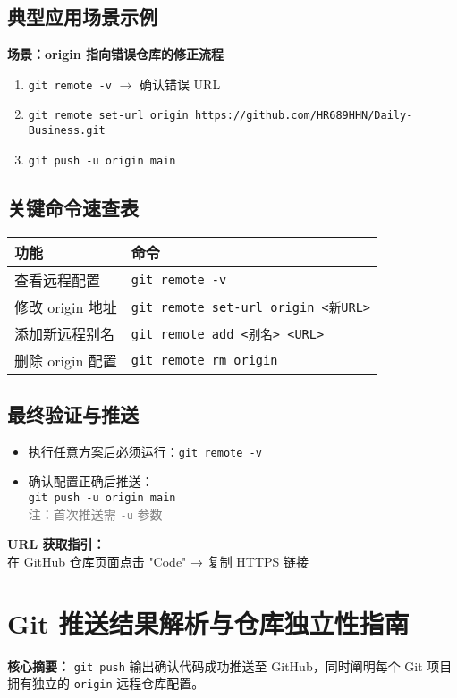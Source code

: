 \subsection{典型应用场景示例}
\textbf{场景：origin 指向错误仓库的修正流程} \\
\begin{enumerate}[leftmargin=*, nosep]
    \item \texttt{git remote -v} $\rightarrow$ 确认错误 URL
    \item \texttt{git remote set-url origin https://github.com/HR689HHN/Daily-Business.git}
    \item \texttt{git push -u origin main}
\end{enumerate}

\subsection{关键命令速查表}
\begin{center}
\begin{tabular}{ll}
    \toprule
    \textbf{功能} & \textbf{命令} \\
    \midrule
    查看远程配置 & \texttt{git remote -v} \\
    修改 origin 地址 & \texttt{git remote set-url origin <新URL>} \\
    添加新远程别名 & \texttt{git remote add <别名> <URL>} \\
    删除 origin 配置 & \texttt{git remote rm origin} \\
    \bottomrule
\end{tabular}
\end{center}

\subsection{最终验证与推送}
\begin{itemize}[leftmargin=*, nosep]
    \item 执行任意方案后必须运行：\texttt{git remote -v}
    \item 确认配置正确后推送：\\
    \texttt{git push -u origin main} \\
    \textcolor{gray}{注：首次推送需 \texttt{-u} 参数}
\end{itemize}

\textbf{URL 获取指引：} \\
在 GitHub 仓库页面点击 "Code" → 复制 HTTPS 链接


\section{Git 推送结果解析与仓库独立性指南}
\textbf{核心摘要：}  
\texttt{git push} 输出确认代码成功推送至 GitHub，同时阐明每个 Git 项目拥有独立的 \texttt{origin} 远程仓库配置。

